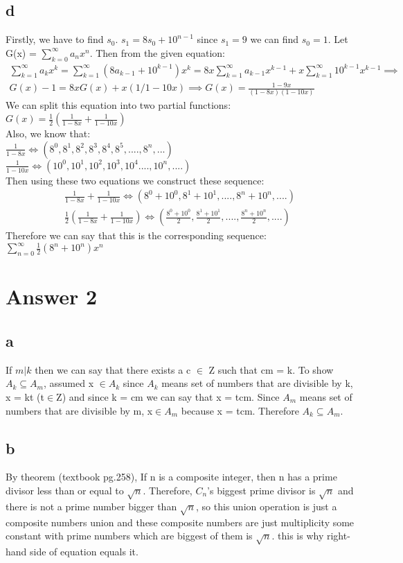 \documentclass[12pt]{article}
\begin{document}
\subsection*{d}
Firstly, we have to find $s_0$. $s_1=8s_0+10^{n-1}$ since $s_1=9$ we can find $s_0=1$. Let G(x) = $\sum_{k=0}^{\infty}a_nx^n$. Then from the given equation:
\begin{equation} 
\begin{split}
    \sum_{k=1}^{\infty}a_kx^k=\sum_{k=1}^{\infty}(8a_{k-1}+10^{k-1})x^k = 8x\sum_{k=1}^{\infty}a_{k-1}x^{k-1}+x\sum_{k=1}^{\infty}10^{k-1}x^{k-1} \implies \\
        G(x)-1=8xG(x)+x(1/1-10x) \implies G(x)=\frac{1-9x}{(1-8x)(1-10x)}
\end{split}    
\end{equation}
We can split this equation into two partial functions: $G(x) = \frac{1}{2}(\frac{1}{1-8x}+\frac{1}{1-10x})$\\
Also, we know that: \\
$\frac{1}{1-8x} \iff (8^0,8^1,8^2,8^3,8^4,8^5,....,8^n,...)$ \\
$\frac{1}{1-10x} \iff (10^0,10^1,10^2,10^3,10^4....,10^n,....)$ \\
Then using these two equations we construct these sequence:
\begin{equation} 
\begin{split}
   \frac{1}{1-8x}+\frac{1}{1-10x} \iff (8^0+10^0,8^1+10^1,....,8^n+10^n,....) \\
   \frac{1}{2}(\frac{1}{1-8x}+\frac{1}{1-10x}) \iff (\frac{8^0+10^0}{2},\frac{8^1+10^1}{2},....,\frac{8^n+10^n}{2},....) 
\end{split}    
\end{equation}
Therefore we can say that this is the corresponding sequence: 
$\sum_{n=0}^{\infty}\frac{1}{2}(8^n+10^n)x^n$
\section*{Answer 2}
\subsection*{a}
If $m|k$ then we can say that there exists a c $\in$ Z such that cm = k. To show $A_k\subseteq A_m$, assumed x $\in A_k$ since $A_k$ means set of numbers that are divisible by k, x = kt (t$\in$Z) and since k = cm we can say that x = tcm. Since $A_m$ means set of numbers that are divisible by m, x$\in A_m$ because x = tcm. Therefore $A_k\subseteq A_m$.
\subsection*{b}
By theorem (textbook pg.258), If n is a composite integer, then n has a prime divisor less than or equal to $\sqrt{n}$. Therefore, $C_n$'s biggest prime divisor is $\sqrt{n}$ and there is not a prime number bigger than $\sqrt{n}$, so this union operation is just a composite numbers union and these composite numbers are just multiplicity some constant with prime numbers which are biggest of them is $\sqrt{n}$. this is why right-hand side of equation equals it.
\end{document}
